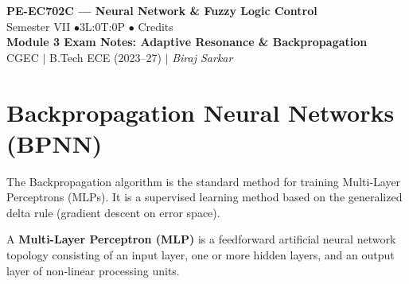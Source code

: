 \documentclass[12pt,a4paper]{article}
\begin{document}

\begin{center}
  {\LARGE\bfseries\color{myred} PE-EC702C --- Neural Network \& Fuzzy Logic Control}\\[5pt]
  {\normalsize\color{mydark} Semester VII \quad$\bullet$\quad 3L:0T:0P \quad$\bullet$ Credits}\\[3pt]
  {\normalsize\color{myteal}\textbf{Module 3 Exam Notes: Adaptive Resonance \& Backpropagation}}\\[3pt]
  {\small\color{mydark} CGEC \;$|$\; B.Tech ECE (2023--27) \;$|$\; \textit{Biraj Sarkar}}
\end{center}
\vspace{2pt}
\noindent{\color{myred}\rule{\linewidth}{1.5pt}}
\vspace{2pt}

\hypersetup{linkcolor=mydark}
\tableofcontents
\hypersetup{linkcolor=myteal}
\newpage

\section{Backpropagation Neural Networks (BPNN)}

The Backpropagation algorithm is the standard method for training Multi-Layer Perceptrons (MLPs). It is a supervised learning method based on the generalized delta rule (gradient descent on error space).

\begin{tcolorbox}[defbox, title={Multi-Layer Perceptron (MLP)}]
A \textbf{Multi-Layer Perceptron (MLP)} is a feedforward artificial neural network topology consisting of an input layer, one or more hidden layers, and an output layer of non-linear processing units.
\end{tcolorbox}
\end{document}
